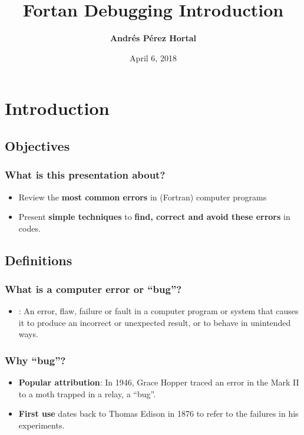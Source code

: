 \documentclass[t]{myBeamer}
\begin{document}
\title{ Fortan Debugging Introduction }   
\author{ \textbf{ Andrés Pérez Hortal} }
\date{April 6, 2018} 

\frame{\titlepage} 



\section{Introduction} 
\subsection{Objectives} 
\begin{frame}[t]
\frametitle{ \huge What is this presentation about? }
  \centering 
  \Large
  \begin{itemize}
    \item Review the \textbf{most common errors} in (Fortran) computer programs    
    \item Present \textbf{simple techniques} to \textbf{find, correct and avoid these errors} in codes.    
  \end{itemize}
\end{frame}

\subsection{Definitions} 
\begin{frame}[t]
\frametitle{ \huge What is a computer error or ``bug''?}
  \centering 
  
  \Large
  
  \begin{itemize}
  \setlength\itemsep{0ex}
  \setlength\parsep{0pt}
  \setlength\parskip{0pt}
   
    \item {} : An error, flaw, failure or fault in a computer program or system that causes it to produce an incorrect or unexpected result, or to behave in unintended ways.
    \vspace{10pt}
    
    \end{itemize}

\end{frame}

\begin{frame}[t]
\frametitle{ \huge Why ``bug''?}
  \centering 
  
  \Large
  
  \begin{itemize}
  \setlength\itemsep{0ex}
  \setlength\parsep{0pt}
  \setlength\parskip{0pt}
   
    \item \textbf{Popular attribution}: In 1946, Grace Hopper traced an error in the Mark II to a moth trapped in a relay, a ``bug''.
    \item \textbf{First use} dates back to Thomas Edison in 1876 to refer to the failures in his experiments. 
  
    \end{itemize} 

\end{frame}
\end{document}
